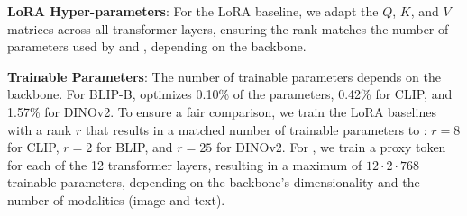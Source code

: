 {\bf LoRA Hyper-parameters}: For the LoRA baseline, we adapt the $Q$, $K$, and $V$ matrices across all transformer layers, ensuring the rank matches the number of parameters used by \ours and \oursp, depending on the backbone.


{\bf Trainable Parameters}: The number of trainable parameters depends on the backbone. For BLIP-B, \ours optimizes 0.10\% of the parameters, 0.42\% for CLIP, and 1.57\% for DINOv2. To ensure a fair comparison, we train the LoRA baselines with a rank $r$ that results in a matched number of trainable parameters to \ours: $r=8$ for CLIP, $r=2$ for BLIP, and $r=25$ for DINOv2. For \oursp, we train a proxy token for each of the 12 transformer layers, resulting in a maximum of $12 \cdot 2 \cdot 768$ trainable parameters, depending on the backbone's dimensionality and the number of modalities (image and text).
